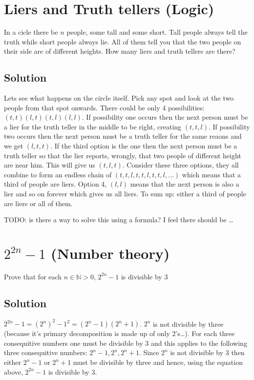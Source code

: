 \documentclass{article}
\begin{document}
\section{Liers and Truth tellers (Logic)}
In a cicle there be $n$ people, some tall and some short. Tall people always tell the truth while short people always lie. All of them tell you that the two people on their side are of different heights. How many liers and truth tellers are there?

\subsection{Solution}
Lets see what happens on the circle itself. Pick any spot and look at the two people from that spot onwards. There could be only 4 possibilities: $(t,t) (l,t) (t,l) (l,l)$. If possibility one occurs then the next person must be a lier for the truth teller in the middle to be right, creating $(t,t,l)$. If possibility two occurs then the next person must be a truth teller for the same reaons and we get $(l,t,t)$. If the third option is the one then the next person must be a truth teller so that the lier reports, wrongly, that two people of different height are near him. This will give us $(t,l,t)$. Consider these three options, they all combine to form an endless chain of $(t,t,l,t,t,l,t,t,l,\ldots)$ which means that a third of people are liers. Option 4, $(l,l)$ means that the next person is also a lier and so on forever which gives us all liers. To sum up: either a third of people are liers or all of them.

TODO: is there a way to solve this using a formula? I feel there should be \ldots

\section{$2^{2n}-1$ (Number theory)}
Prove that for each $n\in \mathbb{N}>0$, $2^{2n}-1$ is divisible by 3

\subsection{Solution}
$2^{2n}-1=(2^{n})^2-1^2=(2^n-1)(2^n+1)$.
$2^n$ is not divisible by three (because it's primary decomposition is made up of only $2$'s\ldots).
For each three consequitive numbers one must be divisible by $3$ and this applies to the following
three consequitive numbers: $2^n-1,2^n,2^n+1$. Since $2^n$ is not divisible by $3$ then either
$2^n-1$ or $2^n+1$ must be divisible by three and hence, using the equation above, $2^{2n}-1$ is
divisible by $3$.
\end{document}
